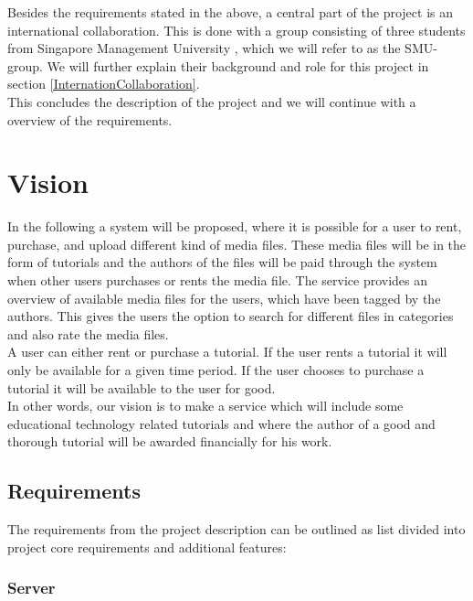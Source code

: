 Besides the requirements stated in the above, a central part of the project is an international collaboration. This is done with a group consisting of three students from Singapore Management University , which we will refer to as the SMU-group. We will further explain their background and role for this project in section \ref{InternationCollaboration}. \\

This concludes the description of the project and we will continue with a overview of the requirements.

\section{Vision}
In the following a system will be proposed, where it is possible for a user to rent, purchase, and upload different kind of media files. These media files will be in the form of tutorials and the authors of the files will be paid through the system when other users purchases or rents the media file. The service provides an overview of available media files for the users, which have been tagged by the authors. This gives the users the option to search for different files in categories and also rate the media files.\\

A user can either rent or purchase a tutorial. If the user rents a tutorial it will only be available for a given time period. If the user chooses to purchase a tutorial it will be available to the user for good. \\ 
In other words, our vision is to make a service which will include some educational technology related tutorials and  where the author of a good and thorough tutorial will be awarded financially for his work.

\subsection{Requirements} \label{Requirements}
The requirements from the project description can be outlined as list divided into project core requirements and additional features:

\subsubsection{Server}

